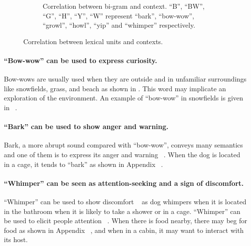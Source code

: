 \begin{figure}[th]
\begin{subfigure}[t]{0.49\textwidth}
	\caption{Correlation between bi-gram and context. 
``B'', ``BW'', ``G'', ``H'', ``Y'', ``W'' represent ``bark'', ``bow-wow'', ``growl'', ``howl'', ``yip'' and ``whimper'' respectively.}
	\label{fig:sequenc_sound_context}
\end{subfigure}
\caption{Correlation between lexical units and contexts.}
\label{fig:correlation}
\end{figure}


\paragraph{``Bow-wow'' can be used to express curiosity.}
Bow-wows are usually used when they are outside and in unfamiliar surroundings like snowfields, grass, and beach as shown in . This word may implicate an exploration of the environment. An example of ``bow-wow'' in snowfields is given in ~.



\paragraph{``Bark'' can be used to show anger and warning.} Bark, a more abrupt sound compared with ``bow-wow'', conveys many semantics and one of them is to express its anger and warning ~\cite{yeon2007vocal}. When the dog is located in a cage, it tends to ``bark'' as shown in Appendix ~.


\paragraph{``Whimper'' can be seen as attention-seeking and a sign of 
discomfort.}
``Whimper'' can be used to show discomfort ~\cite{web2018dog} as dog whimpers when it is located in the bathroom when it is likely to take a shower or in a cage.
``Whimper'' can be used to elicit people attention ~\cite{handelman2012canine}. When there is food nearby, there may beg for food as shown in Appendix ~, and when in a cabin, it may want to interact with its host. 


